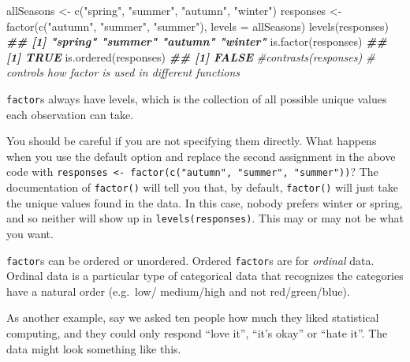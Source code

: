 \documentclass[
  12pt,
  krantz2]{krantz}
\makeatletter
\newenvironment{Shaded}{\begin{snugshade}}{\end{snugshade}}
\newcommand{\AttributeTok}[1]{\textcolor[rgb]{0.61,0.61,0.61}{#1}}
\newcommand{\CommentTok}[1]{\textcolor[rgb]{0.37,0.37,0.37}{\textit{#1}}}
\newcommand{\DocumentationTok}[1]{\textcolor[rgb]{0.37,0.37,0.37}{\textbf{\textit{#1}}}}
\newcommand{\FunctionTok}[1]{\textcolor[rgb]{0,0,0}{#1}}
\newcommand{\NormalTok}[1]{#1}
\newcommand{\OtherTok}[1]{\textcolor[rgb]{0.37,0.37,0.37}{#1}}
\newcommand{\StringTok}[1]{\textcolor[rgb]{0.5,0.5,0.5}{#1}}
\newenvironment{kframe}{%
\medskip{}
\setlength{\fboxsep}{.8em}
 \def\at@end@of@kframe{}%
 \ifinner\ifhmode%
  \def\at@end@of@kframe{\end{minipage}}%
  \begin{minipage}{\columnwidth}%
 \fi\fi%
 \def\FrameCommand##1{\hskip\@totalleftmargin \hskip-\fboxsep
 \colorbox{shadecolor}{##1}\hskip-\fboxsep
     \hskip-\linewidth \hskip-\@totalleftmargin \hskip\columnwidth}%
 \MakeFramed {\advance\hsize-\width
   \@totalleftmargin\z@ \linewidth\hsize
   \@setminipage}}%
 {\par\unskip\endMakeFramed%
 \at@end@of@kframe}
\renewenvironment{Shaded}{\begin{kframe}}{\end{kframe}}
\makeatother
\begin{document}
\begin{Shaded}
\begin{Highlighting}[]
\NormalTok{allSeasons }\OtherTok{\textless{}{-}} \FunctionTok{c}\NormalTok{(}\StringTok{"spring"}\NormalTok{, }\StringTok{"summer"}\NormalTok{, }\StringTok{"autumn"}\NormalTok{, }\StringTok{"winter"}\NormalTok{)}
\NormalTok{responses }\OtherTok{\textless{}{-}} \FunctionTok{factor}\NormalTok{(}\FunctionTok{c}\NormalTok{(}\StringTok{"autumn"}\NormalTok{, }\StringTok{"summer"}\NormalTok{, }\StringTok{"summer"}\NormalTok{), }
                    \AttributeTok{levels =}\NormalTok{ allSeasons)}
\FunctionTok{levels}\NormalTok{(responses)}
\DocumentationTok{\#\# [1] "spring" "summer" "autumn" "winter"}
\FunctionTok{is.factor}\NormalTok{(responses)}
\DocumentationTok{\#\# [1] TRUE}
\FunctionTok{is.ordered}\NormalTok{(responses)}
\DocumentationTok{\#\# [1] FALSE}
\CommentTok{\#contrasts(responses) \# controls how factor is used in different  functions}
\end{Highlighting}
\end{Shaded}

\texttt{factor}s always have levels, which is the collection of all possible unique values each observation can take.

You should be careful if you are not specifying them directly. What happens when you use the default option and replace the second assignment in the above code with \texttt{responses\ \textless{}-\ factor(c("autumn",\ "summer",\ "summer"))}? The documentation of \texttt{factor()} will tell you that, by default, \texttt{factor()} will just take the unique values found in the data. In this case, nobody prefers winter or spring, and so neither will show up in \texttt{levels(responses)}. This may or may not be what you want.

\texttt{factor}s can be ordered or unordered. Ordered \texttt{factor}s are for \emph{ordinal} data. Ordinal data is a particular type of categorical data that recognizes the categories have a natural order (e.g.~low/ medium/high and not red/green/blue).

As another example, say we asked ten people how much they liked statistical computing, and they could only respond ``love it'', ``it's okay'' or ``hate it''. The data might look something like this.
\end{document}
